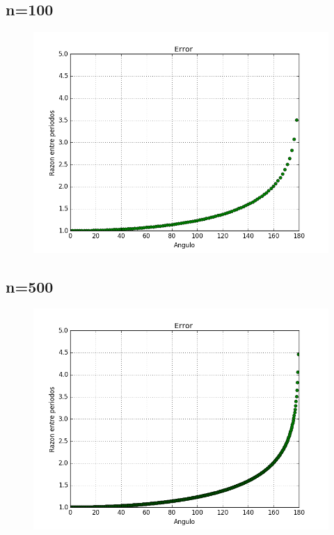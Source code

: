 \documentclass[12pt]{article}
\begin{document}
\subsection{n=100}
\begin{figure}[H]
\includegraphics[scale=.6]{n100}
\end{figure}

\subsection{n=500}
\begin{figure}[H]
\includegraphics[scale=.6]{n500}
\end{figure}
\end{document}
